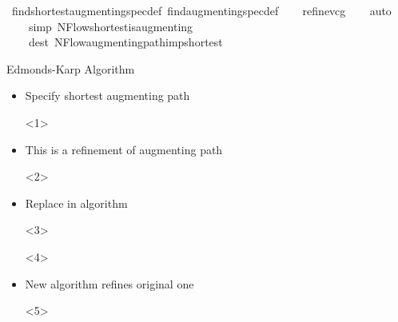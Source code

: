 \documentclass[fleqn]{beamer}
\def\isatagproof{}
\def\endisatagproof{}
\begin{document}
{{\isatagproof
{}\isamarkupfalse%
\ find{\isacharunderscore}shortest{\isacharunderscore}augmenting{\isacharunderscore}spec{\isacharunderscore}def\ find{\isacharunderscore}augmenting{\isacharunderscore}spec{\isacharunderscore}def\isanewline
\ \ \isamarkupfalse%
\ {\isacharparenleft}refine{\isacharunderscore}vcg{\isacharparenright}\isanewline
\ \ \isamarkupfalse%
\ {\isacharparenleft}auto\ \isanewline
\ \ \ \ simp{\isacharcolon}\ NFlow{\isachardot}shortest{\isacharunderscore}is{\isacharunderscore}augmenting\ \isanewline
\ \ \ \ dest{\isacharcolon}\ NFlow{\isachardot}augmenting{\isacharunderscore}path{\isacharunderscore}imp{\isacharunderscore}shortest{\isacharparenright}\isanewline
\ \ \isamarkupfalse%
%
\endisatagproof
}
\begin{frame}[t]{Edmonds-Karp Algorithm}
  \begin{itemize}
   \item<1-> Specify shortest augmenting path
    \begin{onlyenv}<1>
      \vspace*{1em}
      
      \isasnip\snipshortest
    \end{onlyenv}
   \item<2-> This is a refinement of augmenting path
    \begin{onlyenv}<2>
      \vspace*{1em}
      
      \isasnip\snipsrefine
    \end{onlyenv}
   \item<3-> Replace in algorithm
    \begin{onlyenv}<3>
      \vspace*{1em}
      
      \isasnip\snipalgoorig
    \end{onlyenv}
    \begin{onlyenv}<4>
      \vspace*{1em}
      
      \isasnip\snipalgorepl
    \end{onlyenv}
  
   \item<5-> New algorithm refines original one
    \begin{onlyenv}<5>
      \vspace*{1em}
      
      \isasnip\snipalgoref
    \end{onlyenv}

  \end{itemize}
\end{frame}
}
\end{document}
